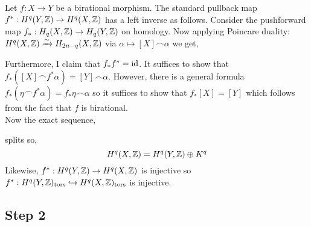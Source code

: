 \documentclass[12pt]{article}
\newcommand{\tors}{\mathrm{tors}}
\begin{document}
Let $f : X \to Y$ be a birational morphism. The standard pullback map $f^* : H^q(Y, \mathbb{Z}) \to H^q(X, \mathbb{Z})$ has a left inverse as follows. Consider the pushforward map $f_* : H_q(X, \mathbb{Z}) \to H_q(Y, \mathbb{Z})$ on homology. Now applying Poincare duality: $H^q(X, \mathbb{Z}) \xrightarrow{\sim} H_{2n-q}(X, \mathbb{Z})$ via $\alpha \mapsto [X] \frown \alpha$ we get,
\begin{center}
\end{center}
Furthermore, I claim that $f_* f^* = \mathrm{id}$. It suffices to show that $f_*([X] \frown f^* \alpha) = [Y] \frown \alpha$. However, there is a general formula $f_*(\eta \frown f^* \alpha) = f_* \eta \frown \alpha$ so it suffices to show that $f_* [X] = [Y]$ which follows from the fact that $f$ is birational. 
\bigskip\\
Now the exact sequence,
\begin{center}
\end{center}
splits so,
\[ H^q(X, \mathbb{Z}) = H^q(Y, \mathbb{Z}) \oplus K^q \]
Likewise, $f^* : H^q(Y, \mathbb{Z}) \to H^q(X, \mathbb{Z})$ is injective so $f^* : H^q(Y, \Z)_{\tors} \embed H^q(X, \Z)_{\tors}$ is injective.

\subsection{Step 2}
\end{document}
